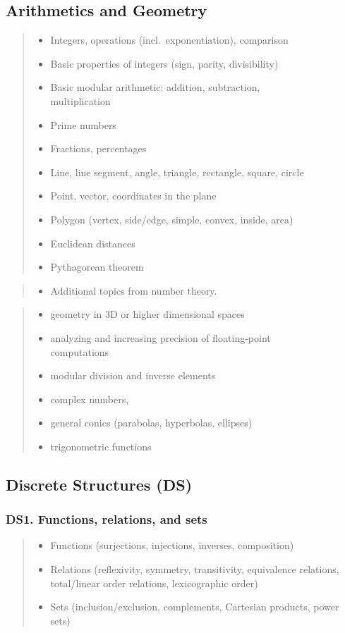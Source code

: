 \documentclass[a4paper,11pt,oneside]{article}
\newcommand{\cmark}{\ding{51}}%
\newcommand{\xmark}{\ding{55}}%
\newcommand{\CC}[1]{#1}
\newcommand{\cincl}{{\small\cmark}}
\newcommand{\cdef}{{\small\cmark\faFileTextO}}
\newcommand{\ccode}{{\small\cmark\faFileText}}
\newcommand{\cemay}{{\small\xmark\faQuestionCircle}}
\newcommand{\cexcl}{{\small\xmark}}
\newcommand{\Iincluded}{\item[\hbox to 1.8em{\cincl\hfill}]}
\newcommand{\Idefine}{\item[\hbox to 1.8em{\cdef\hfill}]}
\newcommand{\Icodeonly}{\item[\hbox to 1.8em{\ccode\hfill}]}
\newcommand{\Iexmaybe}{\item[\hbox to 1.8em{\cemay\hfill}]}
\newcommand{\Iexcluded}{\item[\hbox to 1.8em{\cexcl\hfill}]}
\newenvironment{myitemize}{\begin{quote}\begin{itemize}\itemsep 0pt}{\end{itemize}\end{quote}}
\begin{document}
\subsection {Arithmetics and Geometry}%
\label{subsubsec:NG}

    \begin{myitemize}
    \Iincluded Integers, operations (incl.\ exponentiation), comparison
    \Iincluded Basic properties of integers (sign, parity, divisibility)
    \Iincluded Basic modular arithmetic: addition, subtraction, \\ multiplication
    \Icodeonly Prime numbers
    \Iincluded Fractions, percentages
    \Iincluded Line, line segment, angle, triangle, rectangle, square, circle
    \Iincluded Point, vector, coordinates in the plane
    \Iincluded Polygon (vertex, side/edge, simple, convex, inside, area)
    \Idefine Euclidean distances
    \Icodeonly Pythagorean theorem
    \end{myitemize}

    \begin{myitemize}
    \Iexmaybe Additional topics from number theory.
    \end{myitemize}
    
    \begin{myitemize}
    \Iexcluded geometry in 3D or higher dimensional spaces
    \Iexcluded analyzing and increasing precision of floating-point \\ computations
    \Iexcluded modular division and inverse elements
    \Iexcluded complex numbers,
    \Iexcluded general conics (parabolas, hyperbolas, ellipses)
    \Iexcluded trigonometric functions
    \end{myitemize}

\subsection {Discrete Structures (DS)}%
\label{subsubsec:DS}

    \subsubsection*{DS1. Functions, relations, and sets}

        \begin{myitemize}
        \Idefine\CC{Functions (surjections, injections, inverses, composition)}
        \Idefine\CC{Relations (reflexivity, symmetry, transitivity, equivalence relations,
        total/linear order relations, lexicographic order)}
        \Idefine\CC{Sets (inclusion/exclusion, complements, Cartesian products, power sets)}
        \end{myitemize}
\end{document}
